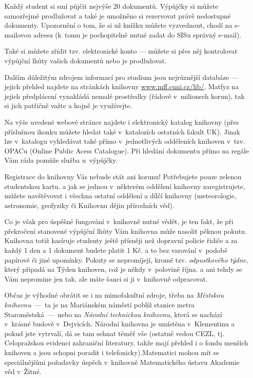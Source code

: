 Každý student si smí půjčit nejvýše 20 dokumentů. Výpůjčky si
můžete samozřejmě prodlužovat a také je umožněno si rezervovat
právě nedostupné dokumenty. Upozornění o tom, že si už knížku
můžete vyzvednout, chodí na e-mailovou adresu (k~tomu je
pochopitelně nutné zadat do SISu správný e-mail).

Také si můžete zřídit tzv. elektronické konto --- můžete si přes
něj kontrolovat výpůjční lhůty vašich dokumentů nebo je
prodlužovat.

Dalším důležitým zdrojem informací pro studium jsou nejrůznější
databáze --- jejich přehled najdete na stránkách knihovny \url{www.mff.cuni.cz/lib/}. Matfyz na jejich předplácení
vynakládá nemalé prostředky (řádově v~milionech korun), tak si
jich patřičně važte a hojně je využívejte.

Na výše uvedené webové stránce najdete i elektronický katalog
knihovny (přes příslušnou ikonku můžete hledat také v~katalozích
ostatních fakult UK). Jinak lze v~katalogu vyhledávat také přímo
v~jednotlivých odděleních knihoven v~tzv. OPACu (Online Public Acess
Catalogue). Při hledání dokumentu přímo na regále Vám ráda pomůže
služba u~výpůjčky.

Registrace do knihovny Vás nebude stát ani korunu! Potřebujete
pouze zelenou studentskou kartu. a jak se jednou v~některém
oddělení knihovny zaregistrujete, můžete navštěvovat i všechna
ostatní oddělení a dílčí knihovny (meteorologie, astronomie,
geofyziky či Knihovnu dějin přírodních věd).

Co je však pro úspěšné fungování v~knihovně nutné vědět, je ten
fakt, že při překročení stanovené výpůjční lhůty Vám knihovna může
nasolit pěknou pokutu. Knihovna totiž kasíruje studenty ještě
přísněji než dopravní policie řidiče a za každý 1 den a 1 dokument
budete platit 1 Kč. a to bez varování v~podobě papírové či jiné
upomínky. Pokuty se nepromíjejí, kromě tzv. {\it odpustkového
týdne}, který připadá na Týden knihoven, což je někdy v~polovině
října. a ani tehdy se Vám nepromine jen tak, ale máte šanci si ji
v~knihovně odpracovat.

Občas je výhodné obrátit se i na mimofakultní zdroje, třeba na
{\it Městskou knihovnu}~---~ta je na Mariánském náměstí poblíž
stanice metra Staroměstská~---~nebo na {\it Národní technickou
knihovnu}, která se nachází v~krásné budově v~Dejvicích. {Národní
knihovna} je umístěna v~Klementinu a pokud jste vytrvalí, dá se
tam sehnat téměř vše (ostatně vedou CEZL, tj. Celopražskou
evidenci zahraniční literatury, takže mají přehled i o fondu
menších knihoven a jsou schopni poradit i telefonicky).Matematici
mohou mít se speciálnějšími požadavky úspěch v~knihovně
Matematického ústavu Akademie věd v~Žitné.
